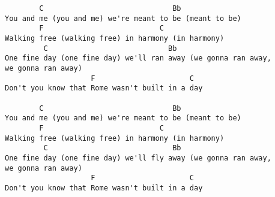 \begin{verbatim}
        C                              Bb
You and me (you and me) we're meant to be (meant to be)
        F                           C
Walking free (walking free) in harmony (in harmony)
         C                            Bb
One fine day (one fine day) we'll ran away (we gonna ran away,
we gonna ran away)
                    F                      C  
Don't you know that Rome wasn't built in a day

        C                              Bb
You and me (you and me) we're meant to be (meant to be)
        F                           C
Walking free (walking free) in harmony (in harmony)
         C                             Bb
One fine day (one fine day) we'll fly away (we gonna ran away,
we gonna ran away)
                    F                      C
Don't you know that Rome wasn't built in a day
\end{verbatim}